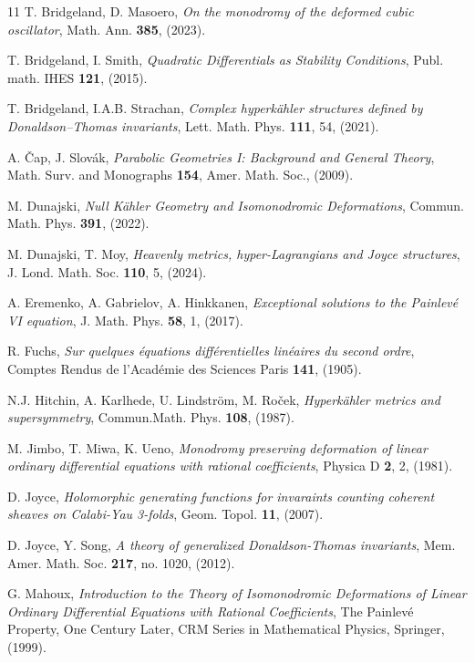 \documentclass[a4paper,12pt,reqno]{amsart}
\numberwithin{equation}{section}
\numberwithin{counter2}{section}
\begin{document}
\begin{thebibliography}{11}
 T.  Bridgeland,   D.  Masoero,
{\em On the monodromy of the deformed cubic oscillator},
Math. Ann.  {\bf 385},  (2023).

 T.  Bridgeland,  I. Smith,
{\em Quadratic Differentials as Stability Conditions},
 Publ.  math.  IHES {\bf 121},  (2015). 
 
 T.  Bridgeland,  I.A.B.  Strachan,
{\em Complex hyperkähler structures defined by Donaldson–Thomas invariants},
Lett.  Math.  Phys.  {\bf 111},  54,  (2021).

 A. \v{C}ap,  J. Slov\'ak, 
{\em Parabolic Geometries I: Background and General Theory},
Math.  Surv.  and Monographs {\bf 154},
Amer.  Math.  Soc.,  (2009).

 M.  Dunajski,  
{\em Null Kähler Geometry and Isomonodromic Deformations},  
Commun.  Math.  Phys.  {\bf 391},  (2022).

 M.  Dunajski,  T.  Moy,  
{\em Heavenly metrics,  hyper-Lagrangians and Joyce structures},
J.  Lond.  Math.  Soc.  {\bf 110},  5,  (2024).   

 A.  Eremenko,  A. Gabrielov,  A.  Hinkkanen,  
{\em Exceptional solutions to the Painlev\'e VI equation},  
J.  Math.  Phys.  {\bf 58},  1, (2017).  

 R.  Fuchs,  {\em Sur quelques \'{e}quations diff\'{e}rentielles lin\'{e}aires du second ordre}, Comptes Rendus de l'Acad\'{e}mie des Sciences Paris {\bf 141},  (1905). 

 N.J.  Hitchin,  A.  Karlhede, U. Lindström, M.  Ro\v{c}ek,  
{\em Hyperkähler metrics and supersymmetry},  
 Commun.Math. Phys.  \textbf{108},  (1987).

 M.  Jimbo,  T.  Miwa,  K.  Ueno,  
{\em Monodromy preserving deformation of linear ordinary differential equations with rational coefficients},  Physica D \textbf{2},  2,  (1981).

 D.  Joyce,  
{\em Holomorphic generating functions for invaraints counting coherent sheaves on Calabi-Yau 3-folds}, 
 Geom.  Topol.  \textbf{11},  (2007).  

 D.  Joyce,  Y.  Song,  
{\em A theory of generalized Donaldson-Thomas invariants},  
Mem.  Amer.  Math.  Soc.  \textbf{217},  no.  1020,  (2012).  

 G.  Mahoux,  
{\em Introduction to the Theory of Isomonodromic Deformations of Linear Ordinary Differential Equations with Rational Coefficients},
The Painlevé Property,  One Century Later,  CRM Series in Mathematical Physics,  Springer,  (1999).  


\end{thebibliography}
\end{document}
